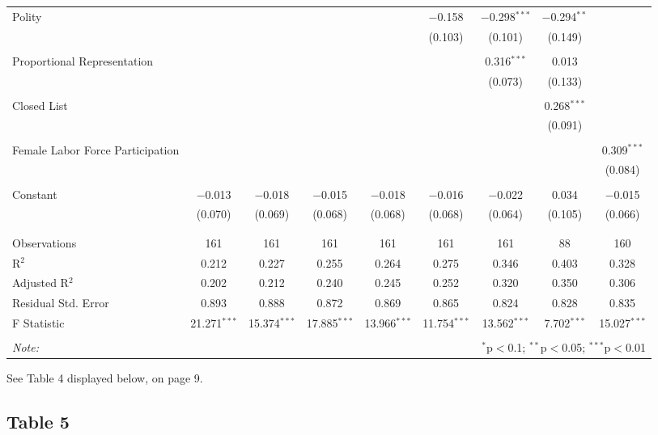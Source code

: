 \documentclass[12pt,letterpaper]{article}
\begin{document}
\begin{table}[!htbp]
\begin{tabular}{@{\extracolsep{-15pt}}lcccccccc}
		Polity &  &  &  &  & $-$0.158 & $-$0.298$^{***}$ & $-$0.294$^{**}$ &  \\ 
		&  &  &  &  & (0.103) & (0.101) & (0.149) &  \\ 
		& & & & & & & & \\ 
		Proportional Representation &  &  &  &  &  & 0.316$^{***}$ & 0.013 &  \\ 
		&  &  &  &  &  & (0.073) & (0.133) &  \\ 
		& & & & & & & & \\ 
		Closed List &  &  &  &  &  &  & 0.268$^{***}$ &  \\ 
		&  &  &  &  &  &  & (0.091) &  \\ 
		& & & & & & & & \\ 
		Female Labor Force Participation &  &  &  &  &  &  &  & 0.309$^{***}$ \\ 
		&  &  &  &  &  &  &  & (0.084) \\ 
		& & & & & & & & \\ 
		Constant & $-$0.013 & $-$0.018 & $-$0.015 & $-$0.018 & $-$0.016 & $-$0.022 & 0.034 & $-$0.015 \\ 
		& (0.070) & (0.069) & (0.068) & (0.068) & (0.068) & (0.064) & (0.105) & (0.066) \\ 
		& & & & & & & & \\ 
		\hline \\[-1.8ex] 
		Observations & 161 & 161 & 161 & 161 & 161 & 161 & 88 & 160 \\ 
		R$^{2}$ & 0.212 & 0.227 & 0.255 & 0.264 & 0.275 & 0.346 & 0.403 & 0.328 \\ 
		Adjusted R$^{2}$ & 0.202 & 0.212 & 0.240 & 0.245 & 0.252 & 0.320 & 0.350 & 0.306 \\ 
		Residual Std. Error & 0.893 & 0.888 & 0.872 & 0.869 & 0.865 & 0.824 & 0.828 & 0.835 \\ 
		F Statistic & 21.271$^{***}$ & 15.374$^{***}$ & 17.885$^{***}$ & 13.966$^{***}$ & 11.754$^{***}$ & 13.562$^{***}$ & 7.702$^{***}$ & 15.027$^{***}$ \\ 
		\hline 
		\hline \\[-1.8ex] 
		\textit{Note:}  & \multicolumn{8}{r}{$^{*}$p$<$0.1; $^{**}$p$<$0.05; $^{***}$p$<$0.01} \\ 
	\end{tabular} 
\end{table} 

\noindent See Table 4 displayed below, on page 9.
\vspace{.5cm}
\subsection*{Table 5}

\end{document}

